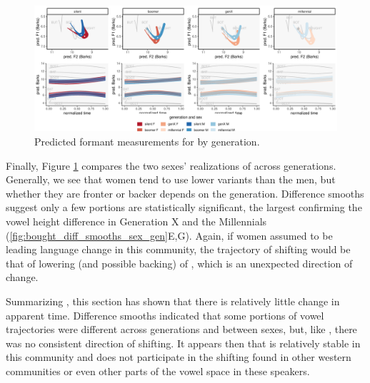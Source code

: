 \begin{figure}[p]
	\centering
	\includegraphics[angle = 90, origin = c, height = \textwidth]{Figures/BOUGHT/BOUGHT_sex_panel_plot_wide.pdf}
	\caption[Predicted formant measurements for \thought by generation.]{Predicted formant measurements for \thought by generation.}
	\label{fig:BOUGHT_sex_panel_plot_wide}
\end{figure}

Finally, Figure \ref{fig:BOUGHT_sex_panel_plot_wide} compares the two sexes' realizations of \thought across generations. Generally, we see that women tend to use lower variants than the men, but whether they are fronter or backer depends on the generation. Difference smooths suggest only a few portions are statistically significant, the largest confirming the vowel height difference in Generation X and the Millennials (\ref{fig:bought_diff_smooths_sex_gen}E,G). Again, if women assumed to be leading language change in this community, the trajectory of shifting would be that of lowering (and possible backing) of \thought, which is an unexpected direction of change.

Summarizing \thought, this section has shown that there is relatively little change in apparent time. Difference smooths indicated that some portions of vowel trajectories were different across generations and between sexes, but, like \lot, there was no consistent direction of shifting. It appears then that \thought is relatively stable in this community and does not participate in the shifting found in other western communities or even other parts of the vowel space in these speakers.

